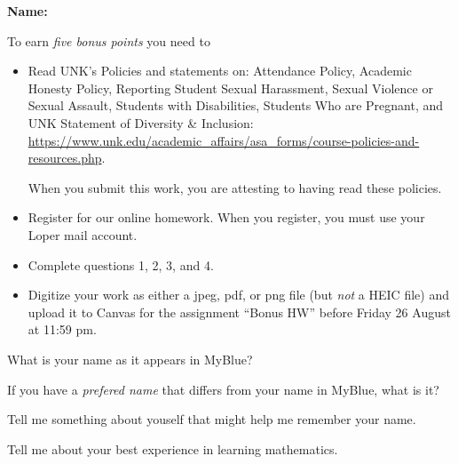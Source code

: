 \documentclass[12pt]{exam}
\newcommand\PM{{\sc pm}}
\newcommand{\quiz}{1}
\newcommand{\term}{Fall}
\newcommand{\due}{Friday 26 August  at 11:59 \PM}
\begin{document}
\large
\vspace{0.1in}
\noindent{}
{\bf Name:}  \\
\noindent \makebox[3.0truein][l]{\bf Bonus   \quiz, \term \/ \the\year}
\vspace{0.1in}


\vspace{0.1in}


\indent To earn \emph{five bonus points} you need to 

\begin{itemize}

    \item Read UNK's Policies and statements on: Attendance Policy, Academic Honesty Policy, Reporting Student Sexual Harassment, 
    Sexual Violence or Sexual Assault, Students with Disabilities, Students Who are Pregnant, and UNK Statement of Diversity \& Inclusion: 
     \small \url{https://www.unk.edu/academic_affairs/asa_forms/course-policies-and-resources.php}.
    
    \large
    When you submit this work, you are attesting to having read these
    policies.

    \item Register for our online homework. When you register, you must 
          use your Loper mail account.
          
    \item Complete questions 1, 2, 3, and 4.
    
    \item Digitize your work as either a jpeg, pdf, or png file (but \emph{not} a  HEIC file) and 
    upload it to Canvas for the assignment ``Bonus HW'' before 
    \due.

\end{itemize}

\begin{questions}  
    
\question What is your name as it appears in MyBlue?

\vspace{0.5in}


\question If you have a \emph{prefered name} that differs from your 
name in MyBlue, what is it?

\vspace{0.5in}


\question Tell me something about youself that might help me remember your name. 
\vspace{1.5in}

\question Tell me about your best experience in learning mathematics. 
\vspace{1.5in}




\end{questions}
\end{document}
